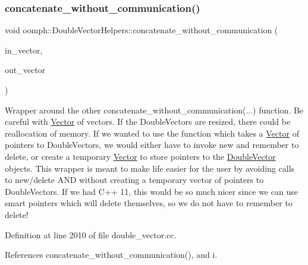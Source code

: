 \mbox{\label{namespaceoomph_1_1DoubleVectorHelpers_a568db46f65c1d234ac6f96ab54fafe60}} 
\subsubsection{\texorpdfstring{concatenate\+\_\+without\+\_\+communication()}{concatenate\_without\_communication()}\hspace{0.1cm}{\footnotesize\ttfamily [2/2]}}
{\footnotesize\ttfamily void oomph\+::\+Double\+Vector\+Helpers\+::concatenate\+\_\+without\+\_\+communication (\begin{DoxyParamCaption}\item[{\hyperlink{classoomph_1_1Vector}{Vector}$<$ \hyperlink{classoomph_1_1DoubleVector}{Double\+Vector} $>$ \&}]{in\+\_\+vector,  }\item[{\hyperlink{classoomph_1_1DoubleVector}{Double\+Vector} \&}]{out\+\_\+vector }\end{DoxyParamCaption})}



Wrapper around the other concatenate\+\_\+without\+\_\+communication(...) function. Be careful with \hyperlink{classoomph_1_1Vector}{Vector} of vectors. If the Double\+Vectors are resized, there could be reallocation of memory. If we wanted to use the function which takes a \hyperlink{classoomph_1_1Vector}{Vector} of pointers to Double\+Vectors, we would either have to invoke new and remember to delete, or create a temporary \hyperlink{classoomph_1_1Vector}{Vector} to store pointers to the \hyperlink{classoomph_1_1DoubleVector}{Double\+Vector} objects. This wrapper is meant to make life easier for the user by avoiding calls to new/delete A\+ND without creating a temporary vector of pointers to Double\+Vectors. If we had C++ 11, this would be so much nicer since we can use smart pointers which will delete themselves, so we do not have to remember to delete! 



Definition at line 2010 of file double\+\_\+vector.\+cc.



References concatenate\+\_\+without\+\_\+communication(), and i.

